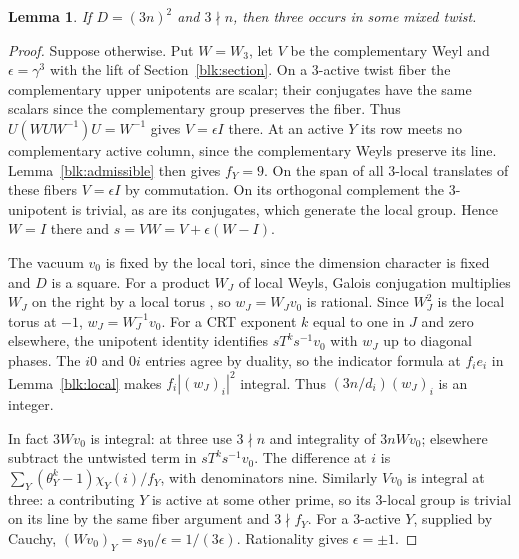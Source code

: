 \documentclass[11pt]{amsart}
\numberwithin{equation}{section}
\newtheorem{lemma}[theorem]{Lemma}
\begin{document}
\begin{lemma}\label{isolated}
If $D=(3n)^2$ and $3\nmid n$, then three occurs in some mixed twist.
\end{lemma}
\begin{proof}
Suppose otherwise. Put $W=W_3$, let $V$ be the complementary Weyl and
$\epsilon=\gamma^3$ with the lift of Section~\ref{blk:section}. On a
$3$-active twist fiber the complementary upper unipotents are scalar;
their conjugates have the same scalars since the complementary group
preserves the fiber. Thus $U(WUW^{-1})U=W^{-1}$ gives $V=\epsilon I$
there. At an active $Y$ its row meets no complementary active column,
since the complementary Weyls preserve its line. Lemma~\ref{blk:admissible}
then gives $f_Y=9$. On the span of all $3$-local translates of these fibers
$V=\epsilon I$ by commutation. On its orthogonal complement the
$3$-unipotent is trivial, as are its conjugates, which generate the local
group. Hence $W=I$ there and $s=VW=V+\epsilon(W-I)$.

The vacuum $v_0$ is fixed by the local tori, since the dimension character
is fixed and $D$ is a square. For a product $W_J$ of local Weyls,
Galois conjugation multiplies $W_J$ on the right by a local torus
\cite[Theorem II and Remark 4.5]{DLNCongruence}, so $w_J=W_Jv_0$ is
rational. Since $W_J^2$ is the local torus at $-1$, $w_J=W_J^{-1}v_0$.
For a CRT exponent $k$ equal to one in $J$ and zero elsewhere, the
unipotent identity identifies $sT^ks^{-1}v_0$ with $w_J$ up to diagonal
phases. The $i0$ and $0i$ entries agree by duality, so the indicator
formula at $f_ie_i$ in Lemma~\ref{blk:local} makes $f_i|(w_J)_i|^2$
integral. Thus $(3n/d_i)(w_J)_i$ is an integer.

In fact $3Wv_0$ is integral: at three use $3\nmid n$ and integrality
of $3nWv_0$; elsewhere subtract the untwisted term in $sT^ks^{-1}v_0$.
The difference at $i$ is $\sum_Y(\theta_Y^k-1)\chi_Y(i)/f_Y$, with
denominators nine. Similarly $Vv_0$ is integral at three: a contributing
$Y$ is active at some other prime, so its $3$-local group is trivial on
its line by the same fiber argument and $3\nmid f_Y$. For a $3$-active
$Y$, supplied by Cauchy, $(Wv_0)_Y=s_{Y0}/\epsilon=1/(3\epsilon)$.
Rationality gives $\epsilon=\pm1$.


\end{proof}
\end{document}
